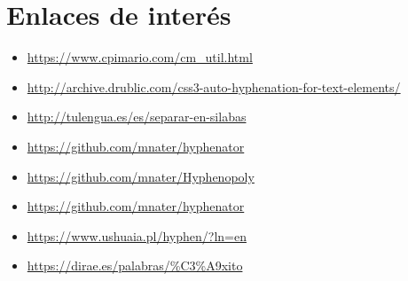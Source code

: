 \documentclass[11pt]{article}
\begin{document}
\section{Enlaces de interés}
\label{sec:org0000036}
\begin{itemize}
\item \url{https://www.cpimario.com/cm\_util.html}
\item \url{http://archive.drublic.com/css3-auto-hyphenation-for-text-elements/}
\item \url{http://tulengua.es/es/separar-en-silabas}
\item \url{https://github.com/mnater/hyphenator}
\item \url{https://github.com/mnater/Hyphenopoly}
\item \url{https://github.com/mnater/hyphenator}
\item \url{https://www.ushuaia.pl/hyphen/?ln=en}
\item \url{https://dirae.es/palabras/\%C3\%A9xito}
\end{itemize}
\end{document}
